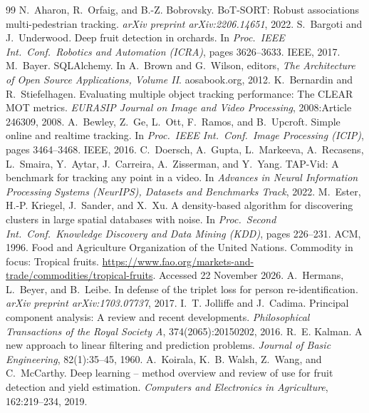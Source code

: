 \documentclass[11pt,a4paper]{article}
\begin{document}
\begin{thebibliography}{99}\small
{} N.~Aharon, R.~Orfaig, and B.-Z. Bobrovsky. BoT-SORT: Robust associations multi-pedestrian tracking. \emph{arXiv preprint arXiv:2206.14651}, 2022.
 S.~Bargoti and J.~Underwood. Deep fruit detection in orchards. In \emph{Proc.\ IEEE Int.\ Conf.\ Robotics and Automation (ICRA)}, pages 3626--3633. IEEE, 2017.
 M.~Bayer. SQLAlchemy. In A.~Brown and G.~Wilson, editors, \emph{The Architecture of Open Source Applications, Volume II}. aosabook.org, 2012.
 K.~Bernardin and R.~Stiefelhagen. Evaluating multiple object tracking performance: The CLEAR MOT metrics. \emph{EURASIP Journal on Image and Video Processing}, 2008:Article 246309, 2008.
 A.~Bewley, Z.~Ge, L.~Ott, F.~Ramos, and B.~Upcroft. Simple online and realtime tracking. In \emph{Proc.\ IEEE Int.\ Conf.\ Image Processing (ICIP)}, pages 3464--3468. IEEE, 2016.
 C.~Doersch, A.~Gupta, L.~Markeeva, A.~Recasens, L.~Smaira, Y.~Aytar, J.~Carreira, A.~Zisserman, and Y.~Yang. TAP-Vid: A benchmark for tracking any point in a video. In \emph{Advances in Neural Information Processing Systems (NeurIPS), Datasets and Benchmarks Track}, 2022.
 M.~Ester, H.-P. Kriegel, J.~Sander, and X.~Xu. A density-based algorithm for discovering clusters in large spatial databases with noise. In \emph{Proc.\ Second Int.\ Conf.\ Knowledge Discovery and Data Mining (KDD)}, pages 226--231. ACM, 1996.
 Food and Agriculture Organization of the United Nations. Commodity in focus: Tropical fruits. \url{https://www.fao.org/markets-and-trade/commodities/tropical-fruits}. Accessed 22 November 2026.
 A.~Hermans, L.~Beyer, and B.~Leibe. In defense of the triplet loss for person re-identification. \emph{arXiv preprint arXiv:1703.07737}, 2017.
 I.~T. Jolliffe and J.~Cadima. Principal component analysis: A review and recent developments. \emph{Philosophical Transactions of the Royal Society A}, 374(2065):20150202, 2016.
 R.~E. Kalman. A new approach to linear filtering and prediction problems. \emph{Journal of Basic Engineering}, 82(1):35--45, 1960.
 A.~Koirala, K.~B. Walsh, Z.~Wang, and C.~McCarthy. Deep learning -- method overview and review of use for fruit detection and yield estimation. \emph{Computers and Electronics in Agriculture}, 162:219--234, 2019.

\end{thebibliography}
\end{document}
